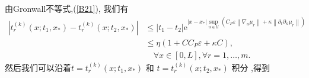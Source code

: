 \documentclass[notitlepage,cs4size,punct,oneside]{ctexrep}
\numberwithin{equation}{chapter}
\theoremstyle{mystyle}
\begin{document}
由Gronwall不等式,(\ref{B21}), 我们有
\begin{align}
    \left|t_{r}^{(k)}\left(x ; t_{1}, x_{*}\right)-t_{r}^{(k)}\left(x ; t_{2}, x_{*}\right)\right| & \leq\left|t_{1}-t_{2}\right| \mathrm{e}^{\left|x-x_{*}\right| \sup _{u \in \mathcal{U}}(C_{P} \varepsilon\left\|\nabla_{u} \mu_{r}\right\|+ \kappa  \left\|\partial _{t} \partial _{\kappa } \mu_{r}\right\|)}\nonumber \\
                                                                                                   & \leq \eta\left(1+C C_{P} \varepsilon + \kappa C\right),\nonumber                                                                                                                                                        \\& \quad \forall x \in[0, L], \forall r=1, \ldots, m . \label{B66}
\end{align}
然后我们可以沿着$t=t_{r}^{(k)}\left(x ; t_{1}, x_{*}\right)$ 和 $t=t_{r}^{(k)}\left(x ; t_{2}, x_{*}\right)$ 积分 ,得到
\end{document}
